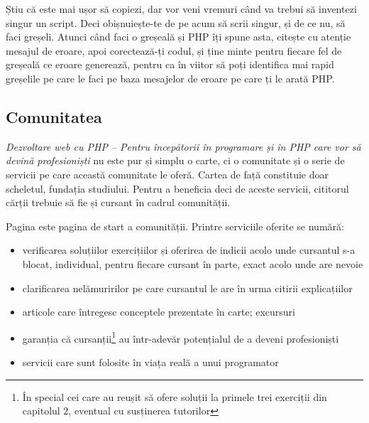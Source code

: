 
Știu că este mai ușor să copiezi, dar vor veni vremuri când va
trebui să inventezi singur un script. Deci obișnuiește-te de
pe acum să scrii singur, și de ce nu, să faci greșeli. Atunci
când faci o greșeală și PHP îți spune asta, citește cu atenție
mesajul de eroare, apoi corectează-ți codul, și ține minte
pentru fiecare fel de greșeală ce eroare generează, pentru ca
în viitor să poți identifica mai rapid greșelile pe care le faci
pe baza mesajelor de eroare pe care ți le arată PHP.


{}
\subsection*{Comunitatea}
\textit{Dezvoltare web cu PHP -- Pentru începătorii în programare și în PHP care vor să devină profesioniști}
nu este pur și simplu o carte, ci o comunitate și o serie de servicii pe care
această comunitate le oferă. Cartea de față constituie doar scheletul, fundația
studiului. Pentru a beneficia deci de aceste servicii, cititorul cărții
trebuie să fie și cursant în cadrul comunității.

Pagina {\phpro} este pagina de start a comunității. Printre serviciile oferite se numără:
\begin{itemize}
	\item verificarea soluțiilor exercițiilor și oferirea de indicii acolo unde cursantul s-a blocat, individual,
pentru fiecare cursant în parte, exact acolo unde are nevoie
	\item clarificarea nelămuririlor pe care cursantul le are în urma citirii explicațiilor
	\item articole care întregesc conceptele prezentate în carte; excursuri
	\item garanția că cursanții\footnote{În special cei care au reușit
să ofere soluții la primele trei exerciții din capitolul 2, eventual cu susținerea
tutorilor} au într-adevăr potențialul de a deveni profesioniști
	\item servicii care sunt folosite în viața reală a unui programator
\end{itemize}

